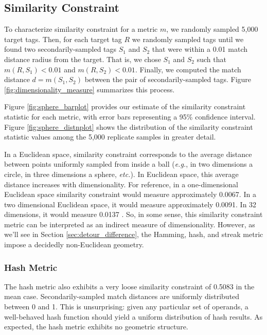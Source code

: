 \subsection{Similarity Constraint} \label{sec:similarityconstraint}



To characterize similarity constraint for a metric $m$, we randomly sampled 5,000 target tags.
Then, for each target tag $R$ we randomly sampled tags until we found two secondarily-sampled tags $S_1$ and $S_2$ that were within a 0.01 match distance radius from the target.
That is, we chose $S_1$ and $S_2$ such that $m(R, S_1) < 0.01$ and $m(R, S_2) < 0.01$.
Finally, we computed the match distance $d = m(S_1, S_2)$ between the pair of secondarily-sampled tags.
Figure \ref{fig:dimensionality_measure} summarizes this process.

Figure \ref{fig:sphere_barplot} provides our estimate of the similarity constraint statistic for each metric, with error bars representing a 95\% confidence interval.
Figure \ref{fig:sphere_distnplot} shows the distribution of the similarity constraint statistic values among the 5,000 replicate samples in greater detail.

In a Euclidean space, similarity constraint corresponds to the average distance between points uniformly sampled from inside a ball (\textit{e.g.}, in two dimensions a circle, in three dimensions a sphere, \textit{etc.}).
In Euclidean space, this average distance increases with dimensionality.
For reference, in a one-dimensional Euclidean space similarity constraint would measure approximately 0.0067.
In a two dimensional Euclidean space, it would measure approximately  0.0091.
In 32 dimensions, it would measure 0.0137 \citep{dunbar1997average}.
So, in some sense, this similarity constraint metric can be interpreted as an indirect measure of dimensionality.
However, as we'll see in Section \ref{sec:detour_difference}, the Hamming, hash, and streak metric impose a decidedly non-Euclidean geometry.

\subsubsection{Hash Metric}

The hash metric also exhibits a very loose similarity constraint of 0.5083 in the mean case.
Secondarily-sampled match distances are uniformly distributed between 0 and 1.
This is unsurprising:
given any particular set of operands, a well-behaved hash function should yield a uniform distribution of hash results.
As expected, the hash metric exhibits no geometric structure.

